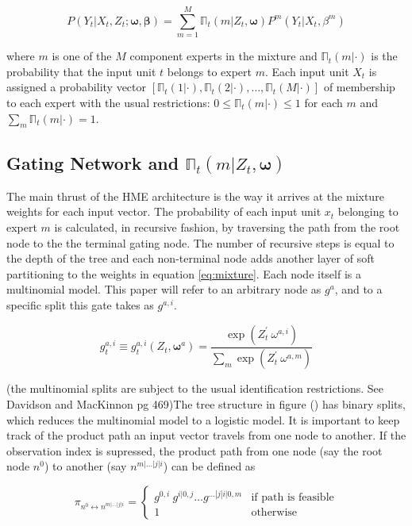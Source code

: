 \documentclass[12pt]{article}
\begin{document}
\begin{equation} \label{eq:mixture}
  P(Y_{t}|X_{t}, Z_{t}; \boldsymbol{\omega}, \boldsymbol{\beta}) = \sum_{m=1}^{M}\mathbb{\Pi}_{t}(m | Z_{t}, \boldsymbol{\omega})P^{m}(Y_{t} | X_{t},\beta^{m})
\end{equation}

where $m$ is one of the $M$ component experts in the mixture and
$\mathbb{\Pi}_{t}(m | \cdot)$ is the probability that the input unit $t$ belongs
to expert $m$. Each input unit $X_{t}$ is assigned a probability vector
$[\mathbb{\Pi}_{t}(1 | \cdot), \mathbb{\Pi}_{t}(2 | \cdot), \ldots, \mathbb{\Pi}_{t}(M | \cdot)]$
of membership to each expert with the usual restrictions:
$0 \leq \mathbb{\Pi}_{t}(m | \cdot) \leq 1$ for each $m$ and
$\sum_{m} \mathbb{\Pi}_{t}(m | \cdot) = 1$.

\subsection{Gating Network and $\mathbb{\Pi}_{t}(m | Z_{t}, \boldsymbol{\omega})$}
The main thrust of the HME architecture is the way it arrives at the mixture
weights for each input vector. The probability of each input unit $x_{t}$
belonging to expert $m$ is calculated, in recursive fashion, by traversing the
path from the root node to the the terminal gating node. The number of
recursive steps is equal to the depth of the tree and each non-terminal node
adds another layer of soft partitioning to the weights in equation 
\ref{eq:mixture}. Each node itself is a multinomial model. This paper will 
refer to an arbitrary node as $g^{a}$, and to a specific split this gate
takes as $g^{a,i}$.

\begin{equation} \label{eq:softmax}
  g^{a,i}_{t} \equiv g^{a,i}_{t}(Z_{t}, \boldsymbol{\omega}^{a}) = \frac{\exp(Z_{t}^{\prime} \ \omega^{a,i})}{\sum_{m}{\exp(Z_{t}^{\prime} \ \omega^{a,m})}}
\end{equation}

(the multinomial splits are subject to the usual identification restrictions.
See Davidson and MacKinnon pg 469)The tree structure in figure () has binary
splits, which reduces the multinomial model to a logistic model. It is important
to keep track of the product
path an input vector travels from one node to another. If the observation index is
supressed, the product path from one node (say the root node $n^{0}$) to
another (say $n^{m|\ldots|j|i}$) can be defined as

\begin{equation} \label{eq:gpath}
  \pi_{n^{0} \longleftrightarrow n^{m|\ldots|j|i}} =
    \begin{cases} 
       g^{0, i} \ g^{i|0, j} \ldots g^{\dots|j|i|0,m} & \textrm{if path is feasible} \\
       1 & \textrm{otherwise}
    \end{cases}
\end{equation}
\end{document}
